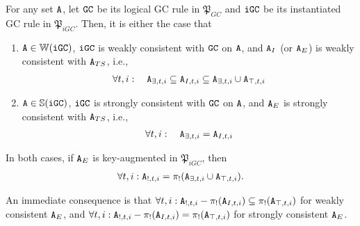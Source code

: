 \begin{thm}
\label{thm:instantiated_correctness}
For any set $\tt{A}$, let $\tt{GC}$ be its logical GC rule in $\mathfrak{P}_{GC}$ and $\tt{iGC}$ be its instantiated GC rule in $\mathfrak{P}_{iGC}$.
Then, it is either the case that
\begin{enumerate}
\item $\tt{A} \in \mathbb{W}(\tt{iGC})$, $\tt{iGC}$ is weakly consistent with $\tt{GC}$ on $\tt{A}$, and $\tt{A}_I$ (or $\tt{A}_E$) is weakly consistent with $\tt{A}_{TS}$, i.e.,
\begin{align}
\forall t, i: \quad \tt{A}_{\exists,t,i} \subseteq \tt{A}_{I,t,i} \subseteq \tt{A}_{\exists,t,i} \cup \tt{A}_{\top,t,i} \label{eq:thm_instantiated_correctness_set}
\end{align}
\item $\tt{A} \in \mathbb{S}(\tt{iGC})$, $\tt{iGC}$ is strongly consistent with $\tt{GC}$ on $\tt{A}$, and $\tt{A}_E$ is strongly consistent with $\tt{A}_{TS}$, i.e.,
\begin{align}
\forall t, i: \quad \tt{A}_{\exists,t,i} = \tt{A}_{I,t,i} \label{eq:thm_instantiated_correctness_set_strong}
\end{align}
\end{enumerate}
In both cases, if $\tt{A}_E$ is key-augmented in $\mathfrak{P}_{iGC}$, then
\begin{align}
\forall t, i : \tt{A}_{!,t,i} = \pi_!(\tt{A}_{\exists,t,i} \cup \tt{A}_{\top,t,i}) \label{eq:thm_instantiated_correctness_key}.
\end{align}
\end{thm}
\begin{rmk}
An immediate consequence is that $\forall t, i: \tt{A}_{!,t,i} - \pi_!(\tt{A}_{I,t,i}) \subseteq \pi_!(\tt{A}_{\top,t,i})$ for weakly consistent $\tt{A}_E$, and $\forall t, i: \tt{A}_{!,t,i} - \pi_!(\tt{A}_{I,t,i}) = \pi_!(\tt{A}_{\top,t,i})$ for strongly consistent $\tt{A}_E$.
\end{rmk}
